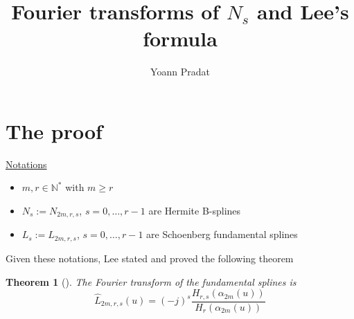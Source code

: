 \documentclass[a4paper, 11pt]{article}
\newtheorem{thm}{Theorem}
\begin{document}
\title{Fourier transforms of $N_s$ and Lee's formula}
\author{Yoann Pradat}
\maketitle
\tableofcontents

\section{The proof}

\underline{Notations}
\begin{itemize}
  \item $m, r \in \mathbb{N}^*$ with $m \geq r$
  \item $N_s := N_{2m,r,s}$, $s=0, \ldots, r-1$ are Hermite B-splines
  \item $L_s := L_{2m,r,s}$, $s=0, \ldots, r-1$ are Schoenberg fundamental splines
\end{itemize}

Given these notations, Lee stated and proved the following theorem
\begin{thm}[{\cite[Theorem 1]{Lee76b}}]\label{thm:Lee1}
  The Fourier transform of the fundamental splines is
  \begin{equation}\label{eq:Lee1}
    \hat{L}_{2m,r,s}(u) = {(-j)}^{s} \frac{H_{r,s}(\alpha_{2m}(u))}{H_r(\alpha_{2m}(u))}
  \end{equation}
\end{thm}
\end{document}
